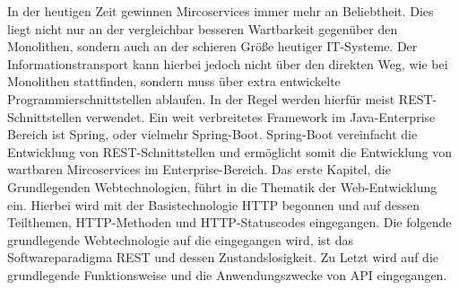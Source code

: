 In der heutigen Zeit gewinnen Mircoservices immer mehr an Beliebtheit. Dies liegt nicht nur an der vergleichbar besseren Wartbarkeit gegenüber den Monolithen, sondern auch an der schieren Größe heutiger IT-Systeme. Der Informationstransport kann hierbei jedoch nicht über den direkten Weg, wie bei Monolithen stattfinden, sondern muss über extra entwickelte Programmierschnittstellen ablaufen. In der Regel werden hierfür meist REST-Schnittstellen verwendet. Ein weit verbreitetes Framework im Java-Enterprise Bereich ist Spring, oder vielmehr Spring-Boot. Spring-Boot vereinfacht die Entwicklung von REST-Schnittstellen und ermöglicht somit die Entwicklung von wartbaren Mircoservices im Enterprise-Bereich. 
\newline
\newline
Das erste Kapitel, die Grundlegenden Webtechnologien, führt in die Thematik der Web-Entwicklung ein. Hierbei wird mit der Basistechnologie HTTP begonnen und auf dessen Teilthemen, HTTP-Methoden und HTTP-Statuscodes eingegangen. Die folgende grundlegende Webtechnologie auf die eingegangen wird, ist das Softwareparadigma REST und dessen Zustandslosigkeit. Zu Letzt wird auf die grundlegende Funktionsweise und die Anwendungszwecke von API eingegangen. 